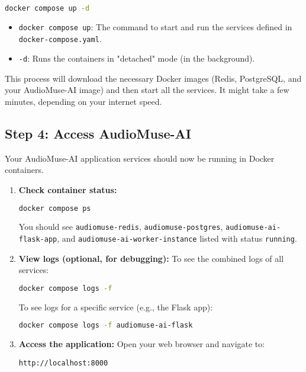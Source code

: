 \documentclass{article}
\begin{document}
\begin{enumerate}
\begin{lstlisting}[language=bash, caption=Run Docker Compose stack]
docker compose up -d
\end{lstlisting}
\begin{itemize}
    \item \texttt{docker compose up}: The command to start and run the services defined in \texttt{docker-compose.yaml}.
    \item \texttt{-d}: Runs the containers in "detached" mode (in the background).
\end{itemize}
This process will download the necessary Docker images (Redis, PostgreSQL, and your AudioMuse-AI image) and then start all the services. It might take a few minutes, depending on your internet speed.

\subsection*{Step 4: Access AudioMuse-AI}

Your AudioMuse-AI application services should now be running in Docker containers.

\begin{enumerate}
    \item \textbf{Check container status:}
    \begin{lstlisting}[language=bash, caption=Check container status]
docker compose ps
    \end{lstlisting}
    You should see \texttt{audiomuse-redis}, \texttt{audiomuse-postgres}, \texttt{audiomuse-ai-flask-app}, and \texttt{audiomuse-ai-worker-instance} listed with status \texttt{running}.

    \item \textbf{View logs (optional, for debugging):}
    To see the combined logs of all services:
    \begin{lstlisting}[language=bash, caption=View combined logs]
docker compose logs -f
    \end{lstlisting}
    To see logs for a specific service (e.g., the Flask app):
    \begin{lstlisting}[language=bash, caption=View specific service logs]
docker compose logs -f audiomuse-ai-flask
    \end{lstlisting}

    \item \textbf{Access the application:}
    Open your web browser and navigate to:
    \begin{verbatim}
http://localhost:8000
    \end{verbatim}
\end{enumerate}


\end{enumerate}
\end{document}
